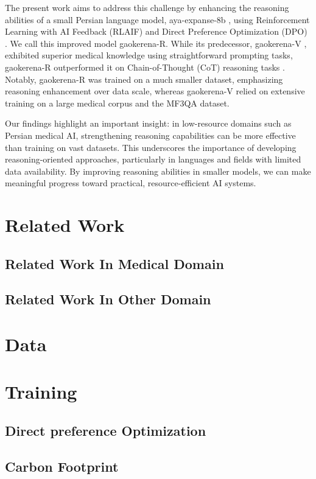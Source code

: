 \documentclass[conference]{IEEEtran}
\begin{document}
The present work aims to address this challenge by enhancing the reasoning abilities of a small Persian language model, aya-expanse-8b
\cite{b5}, using Reinforcement Learning with AI Feedback (RLAIF)
\cite{b6} and Direct Preference Optimization (DPO)
\cite{b7}. We call this improved model gaokerena-R. While its predecessor, gaokerena-V
\cite{b8}, exhibited superior medical knowledge using straightforward prompting tasks, gaokerena-R outperformed it on Chain-of-Thought (CoT) reasoning tasks
\cite{b9}. Notably, gaokerena-R was trained on a much smaller dataset, emphasizing reasoning enhancement over data scale, whereas gaokerena-V relied on extensive training on a large medical corpus and the MF3QA dataset.

Our findings highlight an important insight: in low-resource domains such as Persian medical AI, strengthening reasoning capabilities can be more effective than training on vast datasets. This underscores the importance of developing reasoning-oriented approaches, particularly in languages and fields with limited data availability. By improving reasoning abilities in smaller models, we can make meaningful progress toward practical, resource-efficient AI systems.
	
	\section{Related Work}
	\subsection{Related Work In Medical Domain}
         \subsection{Related Work In Other Domain}


         \section{Data}


           \section{Training}
           \subsection{Direct preference Optimization}
           \subsection{Carbon Footprint}
\end{document}
